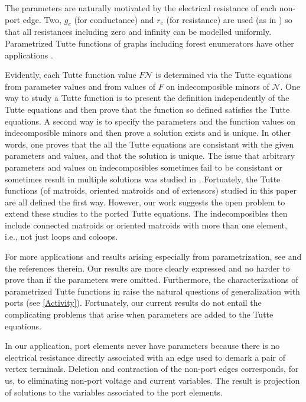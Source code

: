\documentclass[12pt]{article}
\theoremstyle{definition}
\begin{document}
The parameters are naturally motivated by the electrical resistance
of each non-port edge.  Two, $g_e$ (for conductance)
and $r_e$ (for resistance) are used (as in \cite{SmithElec})
so that all resistances including zero and
infinity can be modelled uniformly.  Parametrized Tutte functions
of graphs including forest enumerators have other applications 
\cite{Sokal}.  

Evidently, each Tutte function value $F{\mathcal{N}}$
is determined via the Tutte
equations from parameter values and from values of $F$ on 
indecomposible minors of $\mathcal{N}$.  One way to 
study a Tutte function is to present the definition independently 
of the Tutte equations and then prove that the function so 
defined satisfies the Tutte equations.  A second way is to
specify the parameters and the function values on indecomposible minors and
then prove a solution exists and is unique.  In other words, one
proves that the all the Tutte equations are consistant with the given 
parameters and values, and that the solution is unique.  
The issue 
that arbitrary parameters and values on indecomposibles sometimes
fail to be consistant or sometimes result in multiple solutions was studied
in \cite{MR93a:05047,BollobasRiordanTuttePolyColored,Ellis-Monaghan-Traldi}.
Fortuately, 
the Tutte functions (of matroids, oriented matroids and of extensors)
studied in this paper are all defined the first way.  However,
our work suggests the open problem to extend these studies to the ported
Tutte equations.  The indecomposibles then include connected matroids or 
oriented matroids with more than one element, i.e., not just
loops and coloops.

For more applications and results arising 
especially from parametrization, see 
\cite{MR93a:05047,BollobasRiordanTuttePolyColored,Ellis-Monaghan-Traldi}
and the references therein.  Our results are
more clearly expressed and no harder to prove than if 
the parameters were omitted.  Furthermore, the characterizations
of parametrized Tutte functions in 
\cite{MR93a:05047,BollobasRiordanTuttePolyColored,Ellis-Monaghan-Traldi}
raise the natural questions of generalization with ports
(see \textsection \ref{Activity}).  Fortunately,
our current results do not entail the
complicating problems that arise when parameters
are added to the Tutte equations.

In our application, port elements never have parameters
because there is no electrical resistance directly 
associated with an edge used to demark a pair of
vertex terminals.  Deletion and contraction of 
the non-port edges corresponds, for us, to 
eliminating non-port voltage and current variables.  
The result is
projection of solutions to the variables 
associated to the port elements.
\end{document}
